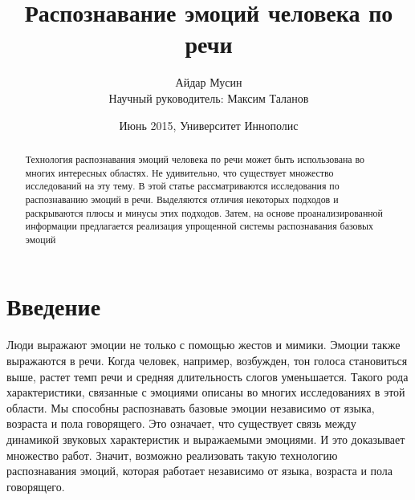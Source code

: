 \documentclass[14pt]{extarticle}
\title{Распознавание эмоций человека по речи}
\author{Айдар Мусин\\Научный руководитель: Максим Таланов}
\date{Июнь 2015, Университет Иннополис}
\begin{document}
\begin{titlepage}
\maketitle
\end{titlepage}

\tableofcontents
\begin{abstract}
	Технология распознавания эмоций человека по речи может быть использована во многих интересных областях. Не удивительно, что существует множество исследований на эту тему. В этой статье рассматриваются исследования по распознаванию эмоций в речи. Выделяются отличия некоторых подходов и раскрываются плюсы и минусы этих подходов. Затем, на основе проанализированной информации предлагается реализация упрощенной системы распознавания базовых эмоций
\end{abstract}

\section{Введение}
Люди выражают эмоции не только с помощью жестов и мимики. Эмоции также выражаются в речи. Когда человек, например, возбужден, тон голоса становиться выше, растет темп речи и средняя длительность слогов уменьшается. Такого рода характеристики, связанные с эмоциями описаны во многих исследованиях в этой области.
Мы способны распознавать базовые эмоции независимо от языка, возраста и пола говорящего. Это означает, что существует связь между динамикой звуковых характеристик и выражаемыми эмоциями. И это доказывает множество работ. Значит, возможно реализовать такую технологию распознавания эмоций, которая работает независимо от языка, возраста и пола говорящего.
\end{document}
